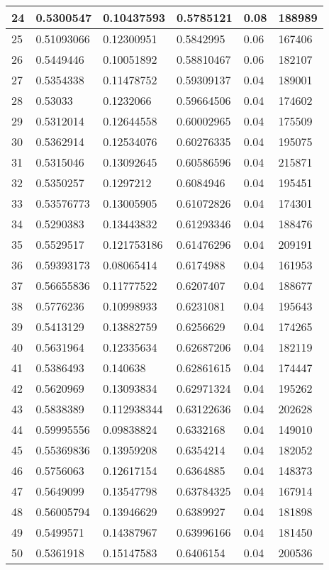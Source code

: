 \begin{longtable}{|l|l|l|l|l|l|}
24 & 0.5300547 & 0.10437593 & 0.5785121 & 0.08 & 188989 \\ \hline 
25 & 0.51093066 & 0.12300951 & 0.5842995 & 0.06 & 167406 \\ \hline 
26 & 0.5449446 & 0.10051892 & 0.58810467 & 0.06 & 182107 \\ \hline 
27 & 0.5354338 & 0.11478752 & 0.59309137 & 0.04 & 189001 \\ \hline 
28 & 0.53033 & 0.1232066 & 0.59664506 & 0.04 & 174602 \\ \hline 
29 & 0.5312014 & 0.12644558 & 0.60002965 & 0.04 & 175509 \\ \hline 
30 & 0.5362914 & 0.12534076 & 0.60276335 & 0.04 & 195075 \\ \hline 
31 & 0.5315046 & 0.13092645 & 0.60586596 & 0.04 & 215871 \\ \hline 
32 & 0.5350257 & 0.1297212 & 0.6084946 & 0.04 & 195451 \\ \hline 
33 & 0.53576773 & 0.13005905 & 0.61072826 & 0.04 & 174301 \\ \hline 
34 & 0.5290383 & 0.13443832 & 0.61293346 & 0.04 & 188476 \\ \hline 
35 & 0.5529517 & 0.121753186 & 0.61476296 & 0.04 & 209191 \\ \hline 
36 & 0.59393173 & 0.08065414 & 0.6174988 & 0.04 & 161953 \\ \hline 
37 & 0.56655836 & 0.11777522 & 0.6207407 & 0.04 & 188677 \\ \hline 
38 & 0.5776236 & 0.10998933 & 0.6231081 & 0.04 & 195643 \\ \hline 
39 & 0.5413129 & 0.13882759 & 0.6256629 & 0.04 & 174265 \\ \hline 
40 & 0.5631964 & 0.12335634 & 0.62687206 & 0.04 & 182119 \\ \hline 
41 & 0.5386493 & 0.140638 & 0.62861615 & 0.04 & 174447 \\ \hline 
42 & 0.5620969 & 0.13093834 & 0.62971324 & 0.04 & 195262 \\ \hline 
43 & 0.5838389 & 0.112938344 & 0.63122636 & 0.04 & 202628 \\ \hline 
44 & 0.59995556 & 0.09838824 & 0.6332168 & 0.04 & 149010 \\ \hline 
45 & 0.55369836 & 0.13959208 & 0.6354214 & 0.04 & 182052 \\ \hline 
46 & 0.5756063 & 0.12617154 & 0.6364885 & 0.04 & 148373 \\ \hline 
47 & 0.5649099 & 0.13547798 & 0.63784325 & 0.04 & 167914 \\ \hline 
48 & 0.56005794 & 0.13946629 & 0.6389927 & 0.04 & 181898 \\ \hline 
49 & 0.5499571 & 0.14387967 & 0.63996166 & 0.04 & 181450 \\ \hline 
50 & 0.5361918 & 0.15147583 & 0.6406154 & 0.04 & 200536 \\ \hline 
\end{longtable}